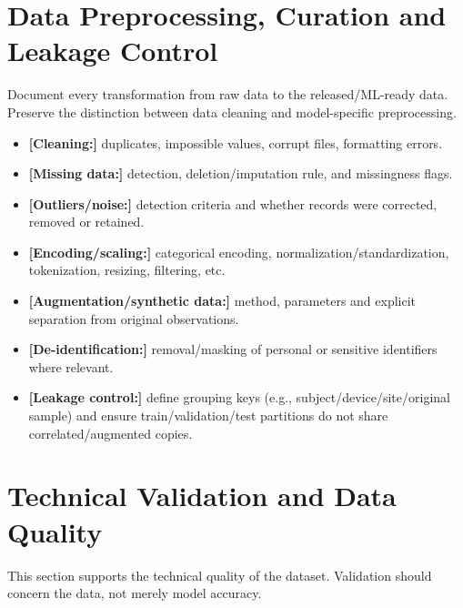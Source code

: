 \documentclass[11pt,a4paper]{article}
\begin{document}
\section{Data Preprocessing, Curation and Leakage Control}
Document every transformation from raw data to the released/ML-ready data. Preserve the distinction between data cleaning and model-specific preprocessing.
\begin{itemize}[leftmargin=1.5em, itemsep=2pt, topsep=2pt]
    \item \textbf{[Cleaning:]} duplicates, impossible values, corrupt files, formatting errors.
    \item \textbf{[Missing data:]} detection, deletion/imputation rule, and missingness flags.
    \item \textbf{[Outliers/noise:]} detection criteria and whether records were corrected, removed or retained.
    \item \textbf{[Encoding/scaling:]} categorical encoding, normalization/standardization, tokenization, resizing, filtering, etc.
    \item \textbf{[Augmentation/synthetic data:]} method, parameters and explicit separation from original observations.
    \item \textbf{[De-identification:]} removal/masking of personal or sensitive identifiers where relevant.
    \item \textbf{[Leakage control:]} define grouping keys (e.g., subject/device/site/original sample) and ensure train/validation/test partitions do not share correlated/augmented copies.
\end{itemize}

\vspace{1.5em}

\section{Technical Validation and Data Quality}
This section supports the technical quality of the dataset. Validation should concern the data, not merely model accuracy.

\vspace{0.5em}
\end{document}
